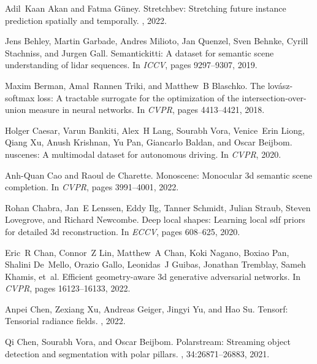 \documentclass[10pt,twocolumn,letterpaper]{article}
\begin{document}
{\small
\begin{thebibliography}{10}\itemsep=-1pt

Adil~Kaan Akan and Fatma G{\"u}ney.
\newblock Stretchbev: Stretching future instance prediction spatially and
  temporally.
, 2022.

Jens Behley, Martin Garbade, Andres Milioto, Jan Quenzel, Sven Behnke, Cyrill
  Stachniss, and Jurgen Gall.
\newblock Semantickitti: A dataset for semantic scene understanding of lidar
  sequences.
\newblock In {\em ICCV}, pages 9297--9307, 2019.

Maxim Berman, Amal~Rannen Triki, and Matthew~B Blaschko.
\newblock The lov{\'a}sz-softmax loss: A tractable surrogate for the
  optimization of the intersection-over-union measure in neural networks.
\newblock In {\em CVPR}, pages 4413--4421, 2018.

Holger Caesar, Varun Bankiti, Alex~H Lang, Sourabh Vora, Venice~Erin Liong,
  Qiang Xu, Anush Krishnan, Yu Pan, Giancarlo Baldan, and Oscar Beijbom.
\newblock nuscenes: A multimodal dataset for autonomous driving.
\newblock In {\em CVPR}, 2020.

Anh-Quan Cao and Raoul de Charette.
\newblock Monoscene: Monocular 3d semantic scene completion.
\newblock In {\em CVPR}, pages 3991--4001, 2022.

Rohan Chabra, Jan~E Lenssen, Eddy Ilg, Tanner Schmidt, Julian Straub, Steven
  Lovegrove, and Richard Newcombe.
\newblock Deep local shapes: Learning local sdf priors for detailed 3d
  reconstruction.
\newblock In {\em ECCV}, pages 608--625, 2020.

Eric~R Chan, Connor~Z Lin, Matthew~A Chan, Koki Nagano, Boxiao Pan, Shalini
  De~Mello, Orazio Gallo, Leonidas~J Guibas, Jonathan Tremblay, Sameh Khamis,
  et~al.
\newblock Efficient geometry-aware 3d generative adversarial networks.
\newblock In {\em CVPR}, pages 16123--16133, 2022.

Anpei Chen, Zexiang Xu, Andreas Geiger, Jingyi Yu, and Hao Su.
\newblock Tensorf: Tensorial radiance fields.
, 2022.

Qi Chen, Sourabh Vora, and Oscar Beijbom.
\newblock Polarstream: Streaming object detection and segmentation with polar
  pillars.
, 34:26871--26883, 2021.


\end{thebibliography}}
\end{document}
